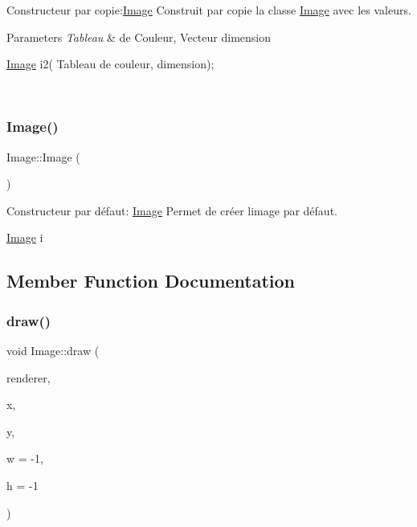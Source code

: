 Constructeur par copie\+:\hyperlink{classImage}{Image} Construit par copie la classe \hyperlink{classImage}{Image} avec les valeurs. 


\begin{DoxyParams}{Parameters}
{\em Tableau} & de Couleur, Vecteur dimension 
\begin{DoxyCode}
\hyperlink{classImage}{Image} i2( Tableau de couleur, dimension);
\end{DoxyCode}
 \\
\hline
\end{DoxyParams}
\mbox{\label{classImage_a58edd1c45b4faeb5f789b0d036d02313}} 
\subsubsection{\texorpdfstring{Image()}{Image()}\hspace{0.1cm}{\footnotesize\ttfamily [4/4]}}
{\footnotesize\ttfamily Image\+::\+Image (\begin{DoxyParamCaption}{ }\end{DoxyParamCaption})}



Constructeur par défaut\+: \hyperlink{classImage}{Image} Permet de créer l\textquotesingle{}image par défaut. 


\begin{DoxyCode}
\hyperlink{classImage}{Image} i
\end{DoxyCode}
 

\subsection{Member Function Documentation}
\mbox{\label{classImage_a82d6936d466ba0161d8b9cbacf613de5}} 
\subsubsection{\texorpdfstring{draw()}{draw()}}
{\footnotesize\ttfamily void Image\+::draw (\begin{DoxyParamCaption}\item[{S\+D\+L\+\_\+\+Renderer $\ast$}]{renderer,  }\item[{int}]{x,  }\item[{int}]{y,  }\item[{int}]{w = {\ttfamily -\/1},  }\item[{int}]{h = {\ttfamily -\/1} }\end{DoxyParamCaption})}



